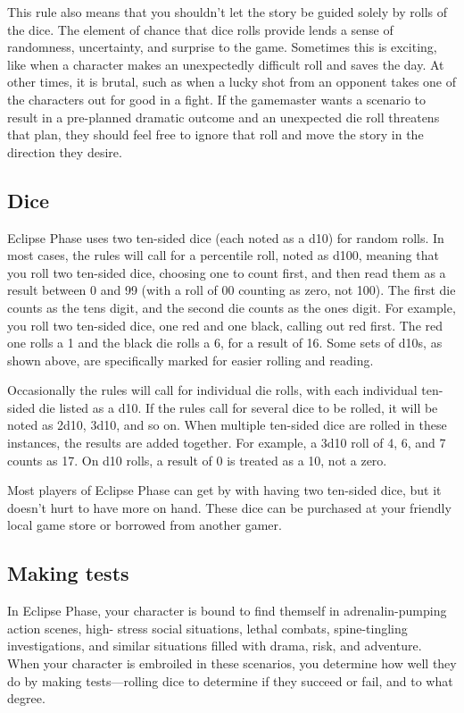 This rule also means that you shouldn't let the story be guided solely by rolls of the dice. The element of chance that dice rolls provide lends a sense of randomness, uncertainty, and surprise to the game. Sometimes this is exciting, like when a character makes an unexpectedly difficult roll and saves the day. At other times, it is brutal, such as when a lucky shot from an opponent takes one of the characters out for good in a fight. If the gamemaster wants a scenario to result in a pre-planned dramatic outcome and an unexpected die roll threatens that plan, they should feel free to ignore that roll and move the story in the direction they desire.

\subsection{Dice}
\label{sec:dice-1}

Eclipse Phase uses two ten-sided dice (each noted as a d10) for random rolls. In most cases, the rules will call for a percentile roll, noted as d100, meaning that you roll two ten-sided dice, choosing one to count first, and then read them as a result between 0 and 99 (with a roll of 00 counting as zero, not 100). The first die counts as the tens digit, and the second die counts as the ones digit. For example, you roll two ten-sided dice, one red and one black, calling out red first. The red one rolls a 1 and the black die rolls a 6, for a result of 16. Some sets of d10s, as shown above, are specifically marked for easier rolling and reading.

Occasionally the rules will call for individual die rolls, with each individual ten-sided die listed as a d10. If the rules call for several dice to be rolled, it will be noted as 2d10, 3d10, and so on. When multiple ten-sided dice are rolled in these instances, the results are added together. For example, a 3d10 roll of 4, 6, and 7 counts as 17. On d10 rolls, a result of 0 is treated as a 10, not a zero.

Most players of Eclipse Phase can get by with having two ten-sided dice, but it doesn't hurt to have more on hand. These dice can be purchased at your friendly local game store or borrowed from another gamer.

\subsection{Making tests}
\label{sec:making-tests}

In Eclipse Phase, your character is bound to find themself in adrenalin-pumping action scenes, high- stress social situations, lethal combats, spine-tingling investigations, and similar situations filled with drama, risk, and adventure. When your character is embroiled in these scenarios, you determine how well they do by making tests—rolling dice to determine if they succeed or fail, and to what degree.

